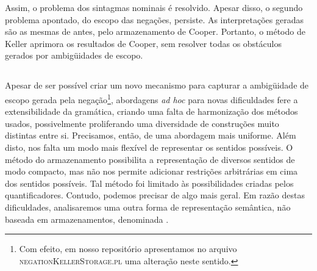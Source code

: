 Assim, o problema dos sintagmas nominais é resolvido. Apesar disso, o segundo problema apontado, do escopo das negações, persiste. As interpretações geradas são as mesmas de antes, pelo armazenamento de Cooper.  Portanto, o método de Keller aprimora os resultados de Cooper, sem resolver todas os obstáculos gerados por ambigüidades de escopo.

\subsection{}

Apesar de ser possível criar um novo mecanismo para capturar a ambigüidade de escopo gerada pela negação\footnote{Com efeito, em nosso repositório apresentamos no arquivo \textsc{negationKellerStorage.pl} uma alteração neste sentido. }, abordagens \textit{ad hoc} para novas dificuldades fere a extensibilidade da gramática, criando uma falta de harmonização dos métodos usados, possivelmente proliferando uma diversidade de construções muito distintas entre si. Precisamos, então, de uma abordagem mais uniforme. 
Além disto, nos falta um modo mais flexível de representar os sentidos possíveis. O método do armazenamento possibilita a representação de diversos sentidos de modo compacto, mas não nos permite adicionar restrições arbitrárias em cima dos sentidos possíveis. Tal método foi limitado às possibilidades criadas pelos quantificadores. Contudo, podemos precisar de algo mais geral. Em razão destas dificuldades, analisaremos uma outra forma de representação semântica, não baseada em armazenamentos, denominada .

